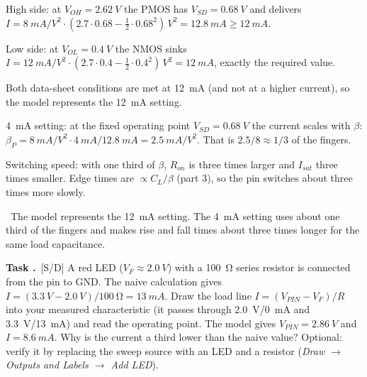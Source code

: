 \documentclass[a4paper,11pt]{article}
\newcounter{task}[section]
\renewcommand{\thetask}{\thesection.\arabic{task}}
\newcommand{\task}[1]{\par\medskip\refstepcounter{task}%
  {\sffamily\bfseries\color{rwuviolet}Task \thetask}\ {\sffamily\small\color{rwucyandark}[#1]}\quad}
\newenvironment{solution}{\begin{solbox}}{\end{solbox}}
\newcommand{\answer}{\par\smallskip{\sffamily\bfseries\color{rwuviolet}Answer:}\ }
\begin{document}
\begin{solution}
\begin{steps}
  \item High side: at $V_{OH}=\SI{2.62}{V}$ the PMOS has $V_{SD}=\SI{0.68}{V}$ and delivers
        $I=\SI{8}{mA/V^2}\cdot(2.7\cdot0.68-\tfrac12\cdot0.68^2)\,\si{V^2}=\SI{12.8}{mA}\ge\SI{12}{mA}$.
  \item Low side: at $V_{OL}=\SI{0.4}{V}$ the NMOS sinks
        $I=\SI{12}{mA/V^2}\cdot(2.7\cdot0.4-\tfrac12\cdot0.4^2)\,\si{V^2}=\SI{12}{mA}$, exactly the required value.
  \item Both data-sheet conditions are met at \SI{12}{mA} (and not at a higher current), so the model represents
        the \SI{12}{mA} setting.
  \item \SI{4}{mA} setting: at the fixed operating point $V_{SD}=\SI{0.68}{V}$ the current scales with $\beta$:
        $\beta_P=\SI{8}{mA/V^2}\cdot\SI{4}{mA}/\SI{12.8}{mA}=\SI{2.5}{mA/V^2}$. That is $2.5/8\approx 1/3$ of
        the fingers.
  \item Switching speed: with one third of $\beta$, $R_{on}$ is three times larger and $I_{sat}$ three times
        smaller. Edge times are $\propto C_L/\beta$ (part 3), so the pin switches about three times more slowly.
\end{steps}
\answer The model represents the \SI{12}{mA} setting. The \SI{4}{mA} setting uses about one third of the
fingers and makes rise and fall times about three times longer for the same load capacitance.
\end{solution}

\task{S/D} A red LED ($V_F\approx\SI{2.0}{V}$) with a \SI{100}{\ohm} series resistor is connected from the pin to
GND. The naive calculation gives $I=(\SI{3.3}{V}-\SI{2.0}{V})/\SI{100}{\ohm}=\SI{13}{mA}$. Draw the load line
$I=(V_{PIN}-V_F)/R$ into your measured characteristic (it passes through \SI{2.0}{V}/\SI{0}{mA} and
\SI{3.3}{V}/\SI{13}{mA}) and read the operating point. The model gives $V_{PIN}=\SI{2.86}{V}$ and $I=\SI{8.6}{mA}$.
Why is the current a third lower than the naive value? Optional: verify it by replacing the sweep source with an
LED and a resistor (\emph{Draw $\rightarrow$ Outputs and Labels $\rightarrow$ Add LED}).
\end{document}
